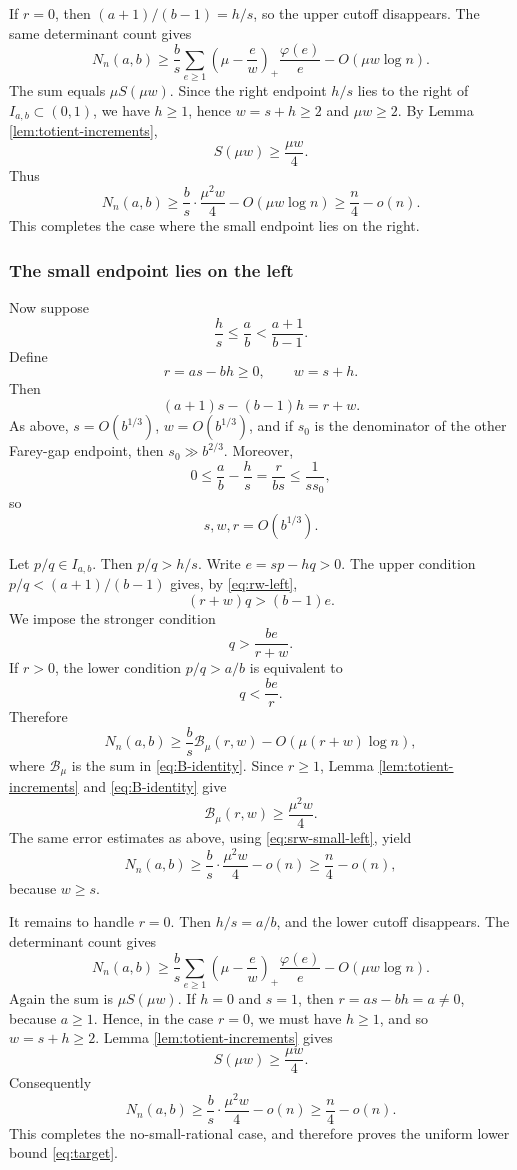 \documentclass[11pt]{article}
\numberwithin{equation}{section}
\theoremstyle{definition}
\theoremstyle{remark}
\newcommand{\1}{\mathbf 1}
\begin{document}
If $r=0$, then $(a+1)/(b-1)=h/s$, so the upper cutoff disappears.  The same determinant count gives
\[
  N_n(a,b)
  \ge \frac bs\sum_{e\ge1}\left(\mu-\frac ew\right)_+\frac{\varphi(e)}e
        -O(\mu w\log n).
\]
The sum equals $\mu S(\mu w)$.  Since the right endpoint $h/s$ lies to the right of $I_{a,b}\subset(0,1)$, we have $h\ge1$, hence $w=s+h\ge2$ and $\mu w\ge2$.  By Lemma \ref{lem:totient-increments},
\[
  S(\mu w)\ge\frac{\mu w}{4}.
\]
Thus
\[
  N_n(a,b)\ge \frac bs\cdot\frac{\mu^2w}{4}-O(\mu w\log n)
             \ge \frac n4-o(n).
\]
This completes the case where the small endpoint lies on the right.

\subsubsection{The small endpoint lies on the left}

Now suppose
\[
  \frac hs\le\frac ab<\frac{a+1}{b-1}.
\]
Define
\[
  r=as-bh\ge0,
  \qquad
  w=s+h.
\]
Then
\begin{equation}\label{eq:rw-left}
  (a+1)s-(b-1)h=r+w.
\end{equation}
As above, $s=O(b^{1/3})$, $w=O(b^{1/3})$, and if $s_0$ is the denominator of the other Farey-gap endpoint, then $s_0\gg b^{2/3}$.  Moreover,
\[
  0\le \frac ab-\frac hs=\frac r{bs}\le\frac1{ss_0},
\]
so
\begin{equation}\label{eq:srw-small-left}
  s,w,r=O(b^{1/3}).
\end{equation}

Let $p/q\in I_{a,b}$.  Then $p/q>h/s$.  Write $e=sp-hq>0$.  The upper condition $p/q<(a+1)/(b-1)$ gives, by \eqref{eq:rw-left},
\[
  (r+w)q>(b-1)e.
\]
We impose the stronger condition
\[
  q>\frac{be}{r+w}.
\]
If $r>0$, the lower condition $p/q>a/b$ is equivalent to
\[
  q<\frac{be}{r}.
\]
Therefore
\[
  N_n(a,b)
  \ge \frac bs\mathcal B_\mu(r,w)-O(\mu(r+w)\log n),
\]
where $\mathcal B_\mu$ is the sum in \eqref{eq:B-identity}.  Since $r\ge1$, Lemma \ref{lem:totient-increments} and \eqref{eq:B-identity} give
\[
  \mathcal B_\mu(r,w)\ge\frac{\mu^2w}{4}.
\]
The same error estimates as above, using \eqref{eq:srw-small-left}, yield
\[
  N_n(a,b)\ge\frac bs\cdot\frac{\mu^2w}{4}-o(n)\ge\frac n4-o(n),
\]
because $w\ge s$.

It remains to handle $r=0$.  Then $h/s=a/b$, and the lower cutoff disappears.  The determinant count gives
\[
  N_n(a,b)
  \ge \frac bs\sum_{e\ge1}\left(\mu-\frac ew\right)_+\frac{\varphi(e)}e
        -O(\mu w\log n).
\]
Again the sum is $\mu S(\mu w)$.  If $h=0$ and $s=1$, then $r=as-bh=a\ne0$, because $a\ge1$.  Hence, in the case $r=0$, we must have $h\ge1$, and so $w=s+h\ge2$.  Lemma \ref{lem:totient-increments} gives
\[
  S(\mu w)\ge\frac{\mu w}{4}.
\]
Consequently
\[
  N_n(a,b)\ge\frac bs\cdot\frac{\mu^2w}{4}-o(n)
             \ge\frac n4-o(n).
\]
This completes the no-small-rational case, and therefore proves the uniform lower bound \eqref{eq:target}.
\end{document}
